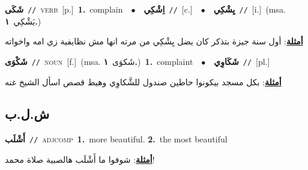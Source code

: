 \documentclass[10pt,a4paper,twoside]{article} %
\begin{document}
\begin{multicols}{2}
{\setlength\topsep{0pt}\textbf{\foreignlanguage{arabic}{شَكَى}}\ {\color{gray}\texttt{//}\color{black}}\ \textsc{verb}\ [p.]\ \textbf{1.}~complain\ \ $\bullet$\ \ \setlength\topsep{0pt}\textbf{\foreignlanguage{arabic}{اِشْكِي}}\ {\color{gray}\texttt{//}\color{black}}\ [c.]\ \ $\bullet$\ \ \setlength\topsep{0pt}\textbf{\foreignlanguage{arabic}{يِشْكِي}}\ {\color{gray}\texttt{//}\color{black}}\ [i.]\ \color{gray}(msa. \foreignlanguage{arabic}{يَشْكِي}~\foreignlanguage{arabic}{\textbf{١.}})\color{black}\  \begin{flushright}\color{gray}\foreignlanguage{arabic}{\textbf{\underline{\foreignlanguage{arabic}{أمثلة}}}: أول سنة جيزة بتذكر كان يضل يِشْكِي من مرته انها مش نظايفية زي امه واخواته}\end{flushright}\color{black}} \vspace{2mm}

{\setlength\topsep{0pt}\textbf{\foreignlanguage{arabic}{شَكْوَى}}\ {\color{gray}\texttt{//}\color{black}}\ \textsc{noun}\ [f.]\ \color{gray}(msa. \foreignlanguage{arabic}{شَكوَى}~\foreignlanguage{arabic}{\textbf{١.}})\color{black}\ \textbf{1.}~complaint\ \ $\bullet$\ \ \setlength\topsep{0pt}\textbf{\foreignlanguage{arabic}{شَكَاوِي}}\ {\color{gray}\texttt{//}\color{black}}\ [pl.]\  \begin{flushright}\color{gray}\foreignlanguage{arabic}{\textbf{\underline{\foreignlanguage{arabic}{أمثلة}}}: بكل مسجد بيكونوا حاطين  صندول للشَّكاوِي وهيط قصص اسأل الشيخ غنه}\end{flushright}\color{black}} \vspace{2mm}

\vspace{-3mm}
\subsection*{\color{blue}\foreignlanguage{arabic}{ش.ل.ب}\color{blue}{}} 

{\setlength\topsep{0pt}\textbf{\foreignlanguage{arabic}{أَشْلَب}}\ {\color{gray}\texttt{//}\color{black}}\ \textsc{adj\textunderscore comp}\ \textbf{1.}~more beautiful.  \textbf{2.}~the most beautiful\  \begin{flushright}\color{gray}\foreignlanguage{arabic}{\textbf{\underline{\foreignlanguage{arabic}{أمثلة}}}: شوفوا ما أَشْلَب هالصبية صلاة محمد!}\end{flushright}\color{black}} \vspace{2mm}


\end{multicols}
\end{document}
